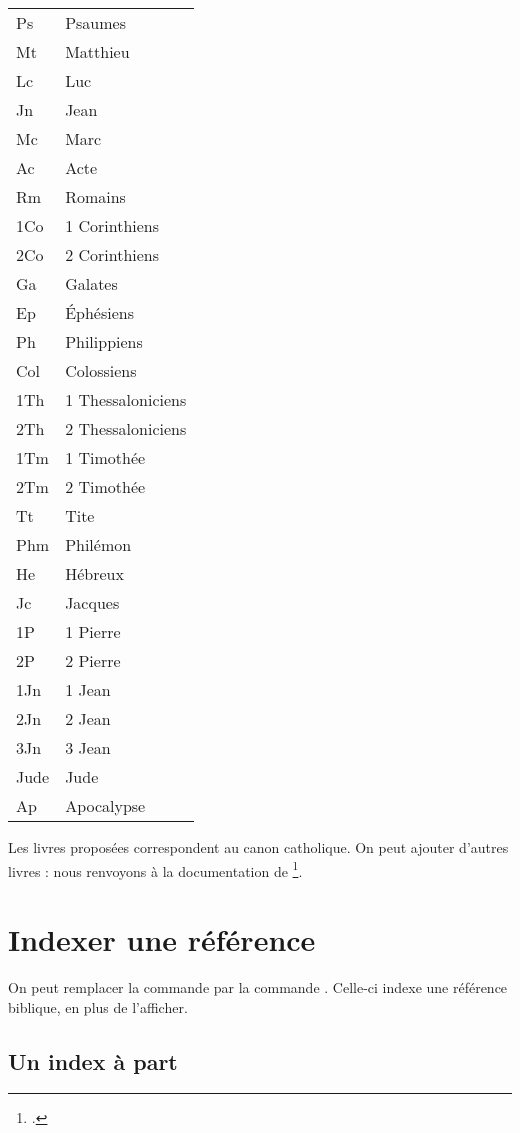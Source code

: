 \begin{longtable}{ll}
Ps	&	Psaumes\\
Mt	&	Matthieu\\
Lc	&	Luc\\
Jn	&	Jean\\
Mc	&	Marc\\
Ac	&	Acte\\
Rm	&	Romains\\
1Co	&	1 Corinthiens\\
2Co	&	2 Corinthiens\\
Ga	&	Galates\\
Ep	&	Éphésiens\\
Ph	&	Philippiens\\
Col	&	Colossiens\\
1Th	&	1 Thessaloniciens\\
2Th	&	2 Thessaloniciens\\
1Tm	&	1 Timothée\\
2Tm	&	2 Timothée\\
Tt	&	Tite\\
Phm	&	Philémon\\
He	&	Hébreux\\
Jc	&	Jacques\\
1P	&	1 Pierre\\
2P	&	2 Pierre\\
1Jn	&	1 Jean\\
2Jn	&	2 Jean\\
3Jn	&	3 Jean\\
Jude	&	Jude\\
Ap	&	Apocalypse\\
\end{longtable}

\begin{anedocte}
Les livres proposées correspondent au canon catholique. On peut ajouter d'autres livres : nous renvoyons à la documentation de \footcite{bibleref_nouveauxlivres}.


\end{anedocte}

\section{Indexer une référence}

On peut remplacer la commande  par la commande . Celle-ci indexe une référence biblique, en plus de l'afficher.

\subsection{Un index à part}

